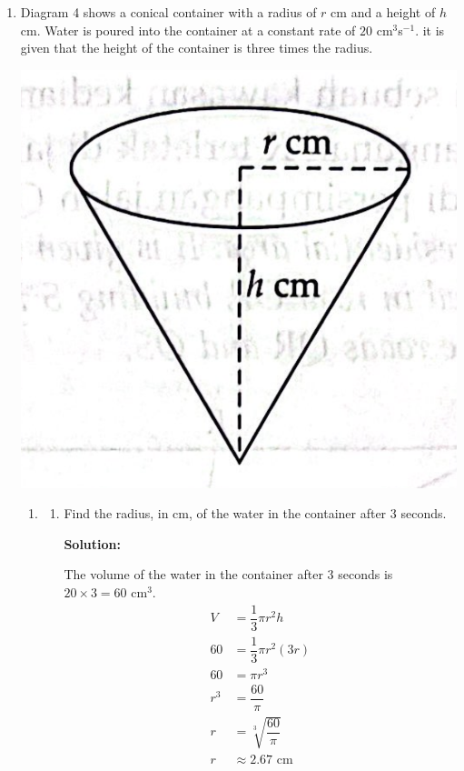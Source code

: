 \documentclass{report}
\newcommand{\sol}{\textbf{Solution:}}
\begin{document}
\begin{enumerate}[leftmargin=*]
          \newpage
    \item Diagram 4 shows a conical container with a radius of $r$ cm and a height of $h$
          cm. Water is poured into the container at a constant rate of $20$
          cm$^3$s$^{-1}$. it is given that the height of the container is three times the
          radius.
          \begin{center}
              \includegraphics[scale=0.15]{assets/14.png}
          \end{center}

          \begin{enumerate}
              \item \begin{enumerate}
                        \item Find the radius, in cm, of the water in the container after 3 seconds.

                              \sol{}

                              The volume of the water in the container after 3 seconds is $20 \times 3 = 60$
                              cm$^3$.
                              \begin{align*}
                                  V   & = \dfrac{1}{3}\pi r^2 h     \\
                                  60  & = \dfrac{1}{3}\pi r^2 (3r)  \\
                                  60  & = \pi r^3                   \\
                                  r^3 & = \dfrac{60}{\pi}           \\
                                  r   & = \sqrt[3]{\dfrac{60}{\pi}} \\
                                  r   & \approx 2.67 \text{ cm}
                              \end{align*}


\end{enumerate}
\end{enumerate}
\end{enumerate}
\end{document}
